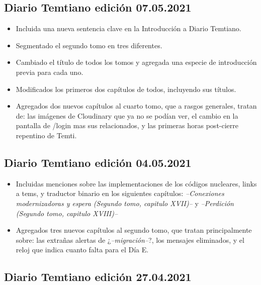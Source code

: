 \documentclass[
  spanish,
]{book}
\begin{document}
\hypertarget{diario-temtiano-ediciuxf3n-07.05.2021}{%
\subsection*{Diario Temtiano edición 07.05.2021}\label{diario-temtiano-ediciuxf3n-07.05.2021}}

\begin{itemize}
\item[$\boxtimes$]
  Incluida una nueva sentencia clave en la Introducción a Diario Temtiano.
\item[$\boxtimes$]
  Segmentado el segundo tomo en tres diferentes.
\item[$\boxtimes$]
  Cambiado el título de todos los tomos y agregada una especie de introducción previa para cada uno.
\item[$\boxtimes$]
  Modificados los primeros dos capítulos de todos, incluyendo sus títulos.
\item[$\boxtimes$]
  Agregados dos nuevos capítulos al cuarto tomo, que a rasgos generales, tratan de: las imágenes de Cloudinary que ya no se podían ver, el cambio en la pantalla de /login mas sus relacionados, y las primeras horas post-cierre repentino de Temti.
\end{itemize}

\hypertarget{diario-temtiano-ediciuxf3n-04.05.2021}{%
\subsection*{Diario Temtiano edición 04.05.2021}\label{diario-temtiano-ediciuxf3n-04.05.2021}}

\begin{itemize}
\item[$\boxtimes$]
  Incluidas menciones sobre las implementaciones de los códigos nucleares, links a tems, y traductor binario en los siguientes capítulos: \emph{--Conexiones modernizadoras y espera (Segundo tomo, capitulo XVII)--} y \emph{--Perdición (Segundo tomo, capitulo XVIII)--}
\item[$\boxtimes$]
  Agregados tres nuevos capítulos al segundo tomo, que tratan principalmente sobre: las extrañas alertas de ¿\emph{--migración--}?, los mensajes eliminados, y el reloj que indica cuanto falta para el Día E.
\end{itemize}

\hypertarget{diario-temtiano-ediciuxf3n-27.04.2021}{%
\subsection*{Diario Temtiano edición 27.04.2021}\label{diario-temtiano-ediciuxf3n-27.04.2021}}
\end{document}
